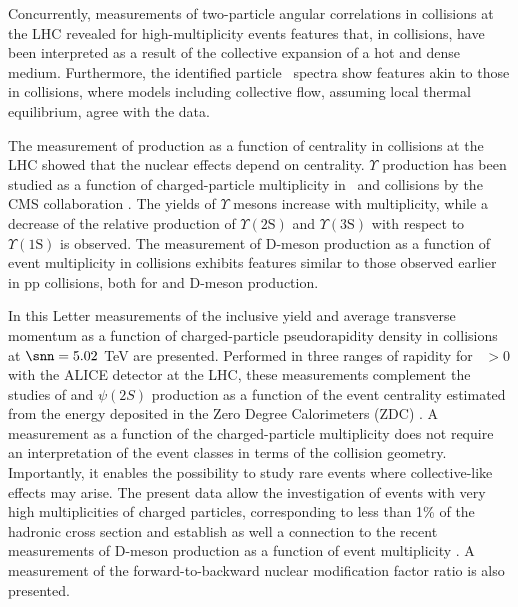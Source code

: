 Concurrently, measurements of two-particle angular correlations in \ppb collisions at the LHC \cite{Chatrchyan:2013aa,Abelev:2013ad,Aad:2013aa,Abelev:2013ae,Chatrchyan:2013ab,Abelev:2014ae,Abelev:2015aa} revealed for high-multiplicity events features that, in \pb collisions, have been interpreted as a result of the collective expansion of a hot and dense medium. 
Furthermore, the identified particle \pt ~spectra \cite{Abelev:2013haa} show features akin to those in \pb collisions, where models  including collective flow, assuming local thermal equilibrium, agree with the data.

The measurement of \jpsi production as a function of centrality in \ppb collisions at the LHC \cite{Adam:2015jsa} showed that the nuclear effects depend on centrality.
$\Upsilon$ production has been studied as a function of charged-particle multiplicity in \pp ~and \ppb collisions by the CMS collaboration \cite{Chatrchyan:2014aa}. The yields of $\Upsilon$ mesons increase with multiplicity, while a decrease of the relative production of $\Upsilon(\mathrm{2S})$ and $\Upsilon(\mathrm{3S})$ with respect to $\Upsilon(\mathrm{1S})$ is observed.
The measurement of D-meson production as a function of event multiplicity in \ppb collisions \cite{Adam:2016mkz} exhibits features similar to those observed earlier in pp collisions, both for \jpsi \cite{Abelev:2012aa} and D-meson \cite{Adam:2015ota} production.

In this Letter measurements of the inclusive \jpsi yield and average transverse momentum as a function of charged-particle pseudorapidity density in \ppb collisions at $\snn=5.02$ TeV are presented. Performed in three ranges of rapidity for \pt ~$>0$ with the ALICE detector at the LHC, these measurements complement the studies of \jpsi and $\psi(2S)$ production as a function of the event centrality estimated from the energy deposited in the Zero Degree Calorimeters (ZDC) \cite{Adam:2015jsa,Abelev:ab}.
A measurement as a function of the charged-particle multiplicity does not require an interpretation of the event classes in terms of the collision geometry. 
Importantly, it enables the possibility to study rare events where collective-like effects may arise. 
The present data allow the investigation of events with very high multiplicities of charged particles, corresponding to less than 1\% of the hadronic cross section and establish as well a connection to the recent measurements of D-meson production as a function of event multiplicity \cite{Adam:2016mkz}. A measurement of the forward-to-backward \jpsi nuclear modification factor ratio is also presented.

